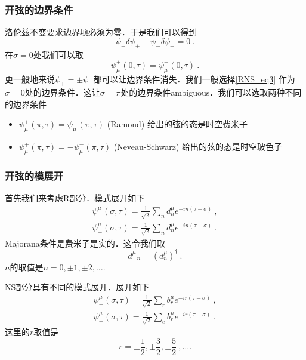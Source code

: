 \subsubsection{开弦的边界条件}
洛伦兹不变要求边界项必须为零．于是我们可以得到
\begin{equation}
\psi_+ \delta \psi_+ - \psi_- \delta \psi_- = 0~.
\end{equation}
在$\sigma = 0$处我们可以取
\begin{equation}\label{RNS_eq3}
\psi^+_\mu(0,\tau) = \psi^-_{\mu} (0,\tau) ~.
\end{equation}
更一般地来说$\psi_+ = \pm \psi_-$都可以让边界条件消失．我们一般选择\autoref{RNS_eq3} 作为$\sigma = 0$处的边界条件．这让$\sigma = \pi$处的边界条件ambiguous．我们可以选取两种不同的边界条件
\begin{itemize}
\item $\psi^+_\mu(\pi,\tau) = \psi^-_\mu(\pi,\tau)$ (Ramond)
给出的弦的态是时空费米子
\item $\psi^+_\mu(\pi,\tau) = - \psi^-_\mu(\pi,\tau)$ (Neveau-Schwarz) 给出的弦的态是时空玻色子
\end{itemize}

\subsubsection{开弦的模展开}
首先我们来考虑R部分．模式展开如下
\begin{equation}
\begin{aligned}
\psi^\mu_-(\sigma,\tau) = \frac{1}{\sqrt{2}} \sum_n d^\mu_n e^{- i n (\tau-\sigma)}~, \\
\psi^\mu_+(\sigma, \tau ) = \frac{1}{\sqrt{2}} \sum_n d^\mu_n e^{- i n (\tau+\sigma)}~.
\end{aligned}
\end{equation}
Majorana条件是费米子是实的．这令我们取
\begin{equation}
d^\mu_{-n} = (d^\mu_n)^\dagger~.
\end{equation}
$n$的取值是$n=0,\pm 1,\pm 2,\ldots$.

NS部分具有不同的模式展开．展开如下
\begin{equation}
\begin{aligned}
\psi^\mu_-(\sigma,\tau) = \frac{1}{\sqrt{2}} \sum_r b^\mu_r e^{- i r(\tau-\sigma)}~, \\
\psi^\mu_+(\sigma,\tau) = \frac{1}{\sqrt{2}} \sum_e b^\mu_r e^{- i r (\tau+\sigma)}~.
\end{aligned}
\end{equation}
这里的$r$取值是
\begin{equation}
r = \pm \frac{1}{2}, \pm \frac{3}{2}, \pm \frac{5}{2}~, \ldots.
\end{equation}

